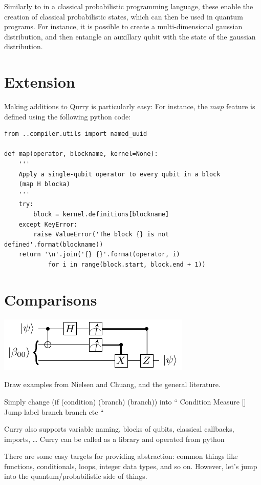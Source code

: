 \documentclass[journal]{article}
\begin{document}
    Similarly to in a classical probabilistic programming language, these enable the creation of classical probabilistic states, which can then be used in quantum programs.
    For instance, it is possible to create a multi-dimensional gaussian distribution, and then entangle an auxillary qubit with the state of the gaussian distribution.

    \section{Extension}

    Making additions to Qurry is particularly easy:
    For instance, the $map$ feature is defined using the following python code:

    \begin{verbatim}
from ..compiler.utils import named_uuid

def map(operator, blockname, kernel=None):
    '''
    Apply a single-qubit operator to every qubit in a block
    (map H blocka)
    '''
    try:
        block = kernel.definitions[blockname]
    except KeyError:
        raise ValueError('The block {} is not defined'.format(blockname))
    return '\n'.join('{} {}'.format(operator, i)
            for i in range(block.start, block.end + 1))
    \end{verbatim}

\section{Comparisons}

\includegraphics{teleport.pdf}

    Draw examples from Nielsen and Chuang, and the general literature.

 Simply change (if (condition) (branch) (branch))
 into
 ``
 Condition
 Measure []
 Jump label
 branch
 branch etc
 ``
 
 Curry also supports variable naming, blocks of qubits, classical callbacks, imports, \dots
 Curry can be called as a library and operated from python
 
 There are some easy targets for providing abstraction: common things like functions, conditionals, loops, integer data types, and so on. 
 However, let's jump into the quantum/probabilistic side of things.
 
\end{document}
